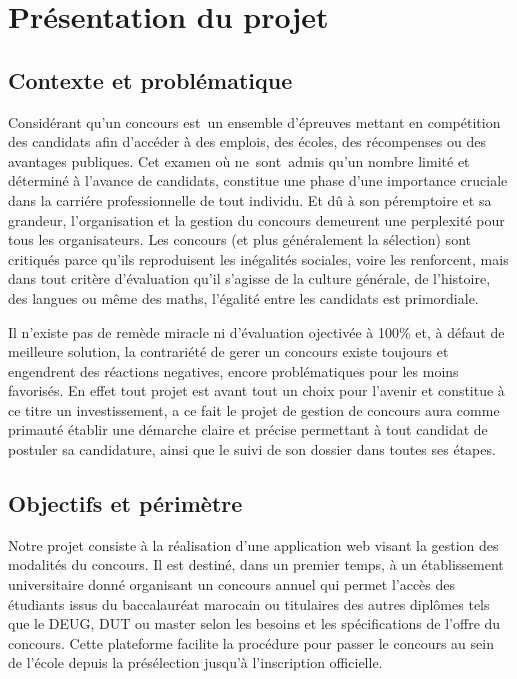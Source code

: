 \section{Présentation du projet}
\subsection{Contexte et problématique}
\setlength{\parindent}{5ex}
Considérant qu’un concours est un ensemble d'épreuves mettant en compétition des 
candidats afin d’accéder à des emplois, des écoles, des récompenses ou des avantages 
publiques. Cet examen où ne sont admis qu'un nombre limité et déterminé à l'avance de 
candidats, constitue une phase d’une importance cruciale dans la carriére 
professionnelle de tout individu. Et dû à son péremptoire et sa grandeur, 
l’organisation et la gestion du concours demeurent une perplexité pour tous 
les organisateurs. Les concours (et plus généralement la sélection) sont critiqués 
parce qu'ils reproduisent les inégalités sociales, voire les renforcent, mais dans 
tout critère d'évaluation qu'il s'agisse de la culture générale, de l'histoire, des 
langues ou même des maths, l’égalité entre les candidats est primordiale.
\newline\indent

Il n'existe pas de remède miracle ni d'évaluation ojectivée à 100\% et, à défaut de 
meilleure solution, la contrariété de gerer un concours existe toujours et engendrent 
des réactions negatives, encore problématiques pour les moins favorisés.
En effet tout projet est avant tout un choix pour l'avenir et constitue à ce titre un 
investissement, a ce fait le projet de gestion de concours aura comme primauté 
établir une démarche claire et précise permettant à tout candidat de postuler sa 
candidature, ainsi que le suivi de son dossier dans toutes ses étapes.


\subsection{Objectifs et périmètre}
\setlength{\parindent}{5ex}
\setlength{\parindent}{5ex}
Notre projet consiste à la réalisation d'une application web visant la gestion des 
modalités du concours. Il est destiné, dans un premier temps, à un établissement 
universitaire donné organisant un concours annuel qui permet l'accès des étudiants 
issus du baccalauréat marocain ou titulaires des autres diplômes tels que le DEUG, 
DUT ou master selon les besoins et les spécifications de l'offre du concours. Cette 
plateforme facilite la procédure pour passer le concours au sein de l'école depuis la 
présélection jusqu'à l'inscription officielle. 

